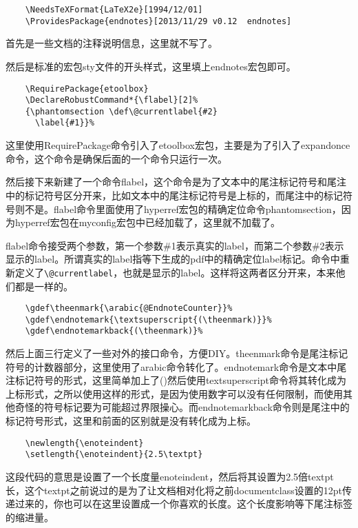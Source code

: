 \documentclass[11pt,oneside]{book}
\begin{document}
  \begin{Verbatim}
    \NeedsTeXFormat{LaTeX2e}[1994/12/01]
    \ProvidesPackage{endnotes}[2013/11/29 v0.12  endnotes]
  \end{Verbatim}
  首先是一些文档的注释说明信息，这里就不写了。

  然后是标准的宏包sty文件的开头样式，这里填上endnotes宏包即可。

  \begin{Verbatim}
    \RequirePackage{etoolbox}
    \DeclareRobustCommand*{\flabel}[2]%
    {\phantomsection \def\@currentlabel{#2}
      \label{#1}}%
  \end{Verbatim}

  这里使用RequirePackage命令引入了etoolbox宏包，主要是为了引入了expandonce命令，这个命令是确保后面的一个命令只运行一次。

  然后接下来新建了一个命令flabel，这个命令是为了文本中的尾注标记符号和尾注中的标记符号区分开来，比如文本中的尾注标记符号是上标的，而尾注中的标记符号则不是。flabel命令里面使用了hyperref宏包的精确定位命令phantomsection，因为hyperref宏包在myconfig宏包中已经加载了，这里就不加载了。

  flabel命令接受两个参数，第一个参数\#{}1表示真实的label，而第二个参数\#{}2表示显示的label。所谓真实的label指等下生成的pdf中的精确定位label标记。命令中重新定义了\verb+\@currentlabel+，也就是显示的label。这样将这两者区分开来，本来他们都是一样的。



  \begin{Verbatim}
    \gdef\theenmark{\arabic{@EndnoteCounter}}%
    \gdef\endnotemark{\textsuperscript{(\theenmark)}}%
    \gdef\endnotemarkback{(\theenmark)}%
  \end{Verbatim}
  然后上面三行定义了一些对外的接口命令，方便DIY。theenmark命令是尾注标记符号的计数器部分，这里使用了arabic命令转化了。endnotemark命令是文本中尾注标记符号的形式，这里简单加上了()然后使用textsuperscript命令将其转化成为上标形式，之所以使用这样的形式，是因为使用数字可以没有任何限制，而使用其他奇怪的符号标记要为可能超过界限操心。而endnotemarkback命令则是尾注中的标记符号形式，这里和前面的区别就是没有转化成为上标。

  \begin{Verbatim}
    \newlength{\enoteindent}
    \setlength{\enoteindent}{2.5\textpt}
  \end{Verbatim}
  这段代码的意思是设置了一个长度量enoteindent，然后将其设置为2.5倍textpt长，这个textpt之前说过的是为了让文档相对化将之前documentclass设置的12pt传递过来的，你也可以在这里设置成一个你喜欢的长度。这个长度影响等下尾注标签的缩进量。
\end{document}
